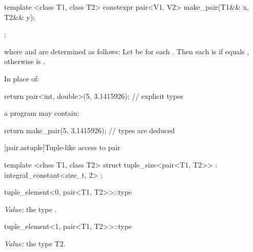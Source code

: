 %
\begin{itemdecl}
template <class T1, class T2>
  constexpr pair<V1, V2> make_pair(T1&& x, T2&& y);
\end{itemdecl}

\begin{itemdescr}
\pnum
\returns {};

where  and  are determined as follows: Let  be
 for each . Then each  is 
if  equals , otherwise  is
.

\pnum
\begin{example}
In place of:

\begin{codeblock}
  return pair<int, double>(5, 3.1415926);   // explicit types
\end{codeblock}

a \Cpp program may contain:

\begin{codeblock}
  return make_pair(5, 3.1415926);           // types are deduced
\end{codeblock}
\end{example}
\end{itemdescr}

[pair.astuple]{Tuple-like access to pair}

%
\begin{itemdecl}
template <class T1, class T2>
struct tuple_size<pair<T1, T2>>
  : integral_constant<size_t, 2> { };
\end{itemdecl}

%
\begin{itemdecl}
tuple_element<0, pair<T1, T2>>::type
\end{itemdecl}
\begin{itemdescr}
\pnum\textit{Value:} the type .
\end{itemdescr}

%
\begin{itemdecl}
tuple_element<1, pair<T1, T2>>::type
\end{itemdecl}
\begin{itemdescr}
\pnum\textit{Value:} the type T2.
\end{itemdescr}

